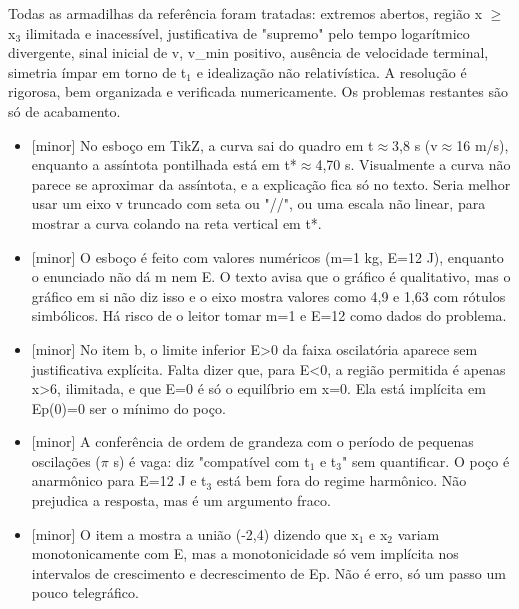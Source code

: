 \documentclass{article}%
\begin{document}
\newline%
Todas as armadilhas da referência foram tratadas: extremos abertos, região x $\geq$ x$_{3}$ ilimitada e inacessível, justificativa de "supremo" pelo tempo logarítmico divergente, sinal inicial de v, v\_min positivo, ausência de velocidade terminal, simetria ímpar em torno de t$_{1}$ e idealização não relativística. A resolução é rigorosa, bem organizada e verificada numericamente. Os problemas restantes são só de acabamento.%
\begin{itemize}%
\item%
{[}minor{]} No esboço em TikZ, a curva sai do quadro em t$\approx$3,8 s (v$\approx$16 m/s), enquanto a assíntota pontilhada está em t*$\approx$4,70 s. Visualmente a curva não parece se aproximar da assíntota, e a explicação fica só no texto. Seria melhor usar um eixo v truncado com seta ou "//", ou uma escala não linear, para mostrar a curva colando na reta vertical em t*.%
\item%
{[}minor{]} O esboço é feito com valores numéricos (m=1 kg, E=12 J), enquanto o enunciado não dá m nem E. O texto avisa que o gráfico é qualitativo, mas o gráfico em si não diz isso e o eixo mostra valores como 4,9 e 1,63 com rótulos simbólicos. Há risco de o leitor tomar m=1 e E=12 como dados do problema.%
\item%
{[}minor{]} No item b, o limite inferior E>0 da faixa oscilatória aparece sem justificativa explícita. Falta dizer que, para E<0, a região permitida é apenas x>6, ilimitada, e que E=0 é só o equilíbrio em x=0. Ela está implícita em Ep(0)=0 ser o mínimo do poço.%
\item%
{[}minor{]} A conferência de ordem de grandeza com o período de pequenas oscilações ($\pi$ s) é vaga: diz "compatível com t$_{1}$ e t$_{3}$" sem quantificar. O poço é anarmônico para E=12 J e t$_{3}$ está bem fora do regime harmônico. Não prejudica a resposta, mas é um argumento fraco.%
\item%
{[}minor{]} O item a mostra a união (-2,4) dizendo que x$_{1}$ e x$_{2}$ variam monotonicamente com E, mas a monotonicidade só vem implícita nos intervalos de crescimento e decrescimento de Ep. Não é erro, só um passo um pouco telegráfico.%
\end{itemize}%
\end{document}
